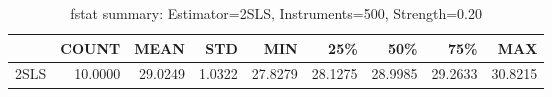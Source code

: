 \begin{table}[ht]
\centering
\caption{fstat summary: Estimator=2SLS, Instruments=500, Strength=0.20}
\begin{tabular}{lrrrrrrrr}
\toprule
 & COUNT & MEAN & STD & MIN & 25\% & 50\% & 75\% & MAX \\
\midrule
2SLS & 10.0000 & 29.0249 & 1.0322 & 27.8279 & 28.1275 & 28.9985 & 29.2633 & 30.8215 \\
\bottomrule
\end{tabular}
\end{table}
